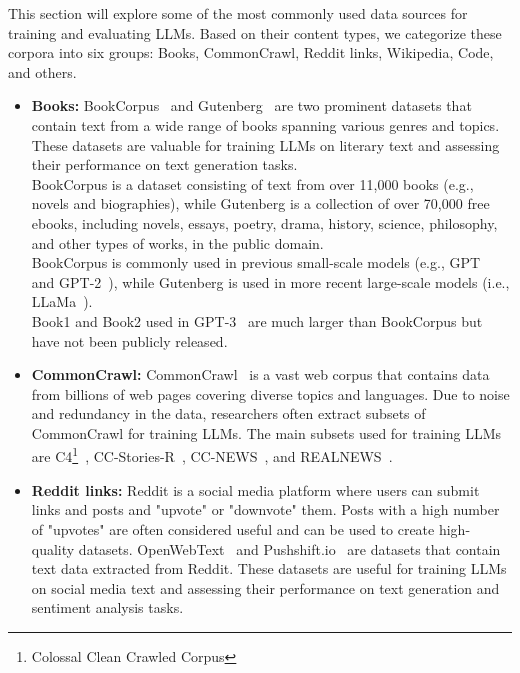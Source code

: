 This section will explore some of the most commonly used data sources for training and evaluating LLMs.
Based on their content types, we categorize these corpora into six groups: Books, CommonCrawl, Reddit links, Wikipedia, Code, and others.

\begin{itemize}
	\item \textbf{Books:} {
		      BookCorpus~\cite{zhu2015aligning} and Gutenberg~\cite{projectgutenberg} are two prominent datasets that contain text from a wide range of books spanning various genres and topics. These datasets are valuable for training LLMs on literary text and assessing their performance on text generation tasks.\\
		      BookCorpus is a dataset consisting of text from over 11,000 books (e.g., novels and biographies), while Gutenberg is a collection of over 70,000 free ebooks, including novels, essays, poetry, drama, history, science, philosophy, and other types of works, in the public domain.\\
		      BookCorpus is commonly used in previous small-scale models (e.g., GPT~\cite{radford2018improving} and GPT-2~\cite{radford2019language}), while Gutenberg is used in more recent large-scale models (i.e., LLaMa~\cite{touvron2023llama}).\\
		      Book1 and Book2 used in GPT-3~\cite{brown2020language} are much larger than BookCorpus but have not been publicly released.
	      }
	\item \textbf{CommonCrawl:} {
		      CommonCrawl~\cite{commoncrawl} is a vast web corpus that contains data from billions of web pages covering diverse topics and languages. Due to noise and redundancy in the data, researchers often extract subsets of CommonCrawl for training LLMs. The main subsets used for training LLMs are C4\footnote{Colossal Clean Crawled Corpus}~\cite{raffel2023exploring}, CC-Stories-R~\cite{trinh2018simple}, CC-NEWS~\cite{liu2019roberta}, and REALNEWS~\cite{zellers2019defending}.\\
	      }
	\item \textbf{Reddit links:} {
		      Reddit is a social media platform where users can submit links and posts and "upvote" or "downvote" them. Posts with a high number of "upvotes" are often considered useful and can be used to create high-quality datasets.
		      OpenWebText~\cite{gokaslan2019openwebtext} and Pushshift.io~\cite{baumgartner2020pushshift} are datasets that contain text data extracted from Reddit. These datasets are useful for training LLMs on social media text and assessing their performance on text generation and sentiment analysis tasks.
}
\end{itemize}
